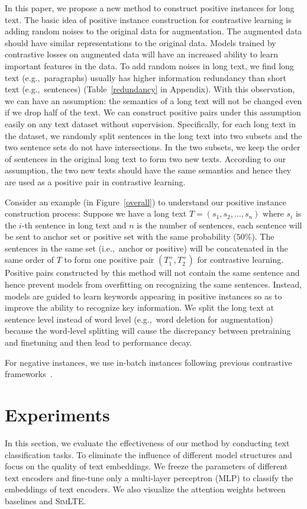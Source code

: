 \documentclass[11pt]{article}
\newcommand{\our}{\mbox{\textsc{SimLTE}}}
\begin{document}
In this paper, we propose a new method to construct positive instances for long text. 
The basic idea of positive instance construction for contrastive learning is adding random noises to the original data for augmentation. 
The augmented data should have similar representations to the original data. 
Models trained by contrastive losses on augmented data will have an increased ability to learn important features in the data.
To add random noises in long text, we find long text (e.g.,~paragraphs) usually has higher information redundancy than short text (e.g.,~sentences) (Table~\ref{redundancy} in Appendix). With this observation, we can have an assumption: 
the semantics of a long text will not be changed even if we drop half of the text. 
We can construct positive pairs under this assumption easily on any text dataset without supervision.
Specifically, for each long text in the dataset, we randomly split sentences in the long text into two subsets and the two sentence sets do not have intersections. 
In the two subsets, we keep the order of sentences in the original long text to form two new texts. 
According to our assumption, the two new texts should have the same semantics and hence they are used as a positive pair in contrastive learning. 

Consider an example (in Figure~\ref{overall}) to understand our positive instance construction process:
Suppose we have a long text $T = (s_1, s_2,\dots,s_n)$ where $s_i$ is the $i$-th sentence in long text and $n$ is the number of sentences, each sentence will be sent to anchor set or positive set with the same probability ($50\%$). 
The sentences in the same set (i.e.,~anchor or positive) will be concatenated in the same order of $T$ to form one positive pair $(T^+_1, T^+_2)$ for contrastive learning. 
Positive pairs constructed by this method will not contain the same sentence and hence prevent models from overfitting on recognizing the same sentences. 
Instead, models are guided to learn keywords appearing in positive instances so as to improve the ability to recognize key information. 
We split the long text at sentence level instead of word level (e.g.,~word deletion for augmentation) because the word-level splitting will cause the discrepancy between pretraining and finetuning and then lead to performance decay.

For negative instances, we use in-batch instances following previous contrastive frameworks~\cite{Gao2021SimCSESC, Li2022UCTopicUC}.

\section{Experiments}
\label{sec:experiments}
In this section, we evaluate the effectiveness of our method by conducting text classification tasks. 
To eliminate the influence of different model structures and focus on the quality of text embeddings. 
We freeze the parameters of different text encoders and fine-tune only a multi-layer perceptron (MLP) to classify the embeddings of text encoders.
We also visualize the attention weights between baselines and \our.
\end{document}
